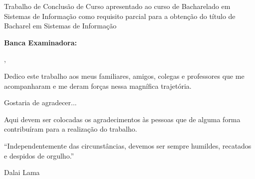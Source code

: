 % 
\begin{folhadeaprovacao}

	\begin{center}
		{\ABNTEXchapterfont\bfseries\imprimirautor}
		\vspace{6em}

			\ABNTEXchapterfont\bfseries\imprimirtitulo
		
	\end{center}
		\vspace{1em}
		{\justify
		Trabalho de Conclusão de Curso apresentado ao curso de Bacharelado em Sistemas de Informação como requisito parcial para a obtenção do título de Bacharel em Sistemas de Informação}
	
	\vspace{3em} 
	\noindent
	{\bfseries Banca Examinadora:}

    \vspace*{\fill}
    \begin{center}
    	\imprimirlocal,\,\imprimirfulldata
    \end{center}
\end{folhadeaprovacao}

\begin{dedicatoria}				
Dedico este trabalho aos meus familiares, amigos, colegas e professores que me acompanharam e me deram forças nessa magnífica trajetória.  
\end{dedicatoria}

\begin{agradecimentos}
Gostaria de agradecer...

Aqui devem ser colocadas os agradecimentos às pessoas que de alguma forma contribuíram para a realização do trabalho.
\end{agradecimentos}

\begin{epigrafe}	
``Independentemente das circunstâncias, devemos ser sempre humildes, recatados e despidos de orgulho.''
\\
\par
Dalai Lama 
\end{epigrafe}

